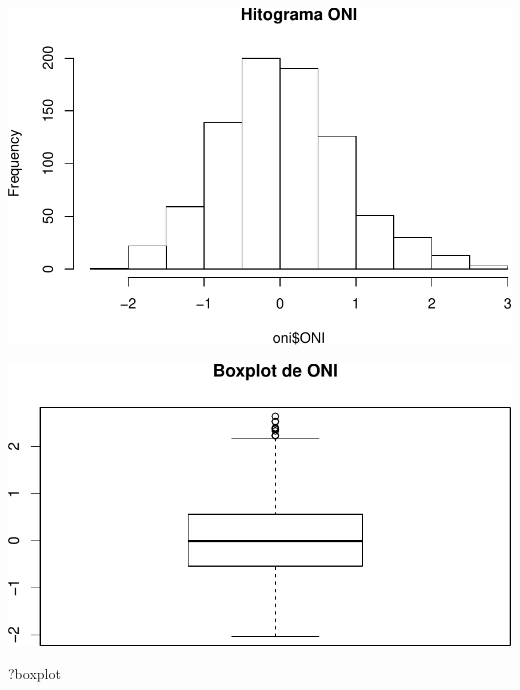 \documentclass[]{book}
\newenvironment{Shaded}{\begin{snugshade}}{\end{snugshade}}
\newcommand{\DataTypeTok}[1]{\textcolor[rgb]{0.13,0.29,0.53}{#1}}
\newcommand{\KeywordTok}[1]{\textcolor[rgb]{0.13,0.29,0.53}{\textbf{#1}}}
\newcommand{\NormalTok}[1]{#1}
\newcommand{\OperatorTok}[1]{\textcolor[rgb]{0.81,0.36,0.00}{\textbf{#1}}}
\newcommand{\StringTok}[1]{\textcolor[rgb]{0.31,0.60,0.02}{#1}}
\begin{document}
\begin{Shaded}
\end{Shaded}

\includegraphics{bookdown-demo_files/figure-latex/unnamed-chunk-40-1.pdf}

\begin{Shaded}
\end{Shaded}

\includegraphics{bookdown-demo_files/figure-latex/unnamed-chunk-40-2.pdf}

\begin{Shaded}
\begin{Highlighting}[]
\NormalTok{?boxplot}
\end{Highlighting}
\end{Shaded}
\end{document}
